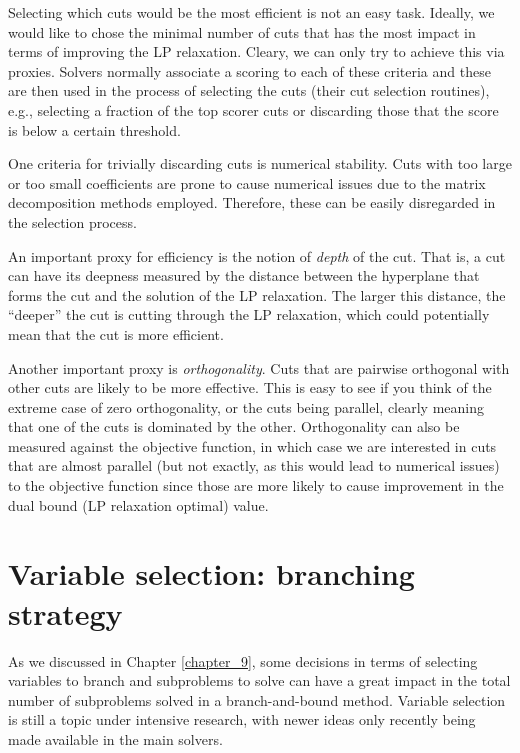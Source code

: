 Selecting which cuts would be the most efficient is not an easy task. Ideally, we would like to chose the minimal number of cuts that has the most impact in terms of improving the LP relaxation. Cleary, we can only try to achieve this via proxies. Solvers normally associate a scoring to each of these criteria and these are then used in the process of selecting the cuts (their cut selection routines), e.g., selecting a fraction of the top scorer cuts or discarding those that the score is below a certain threshold.

One criteria for trivially discarding cuts is numerical stability. Cuts with too large or too small coefficients are prone to cause numerical issues due to the matrix decomposition methods employed. Therefore, these can be easily disregarded in the selection process. 

An important proxy for efficiency is the notion of \emph{depth} of the cut. That is, a cut can have its deepness measured by the distance between the hyperplane that forms the cut and the solution of the LP relaxation. The larger this distance, the ``deeper'' the cut is cutting through the LP relaxation, which could potentially mean that the cut is more efficient. 

Another important proxy is \emph{orthogonality}. Cuts that are pairwise orthogonal with other cuts are likely to be more effective. This is easy to see if you think of the extreme case of zero orthogonality, or the cuts being parallel, clearly meaning that one of the cuts is dominated by the other. Orthogonality can also be measured against the objective function, in which case we are interested in cuts that are almost parallel (but not exactly, as this would lead to numerical issues) to the objective function since those are more likely to cause improvement in the dual bound (LP relaxation optimal) value.


\section{Variable selection: branching strategy}

As we discussed in Chapter \ref{chapter_9}, some decisions in terms of selecting variables to branch and subproblems to solve can have a great impact in the total number of subproblems solved in a branch-and-bound method. Variable selection is still a topic under intensive research, with newer ideas only recently being made available in the main solvers. 




